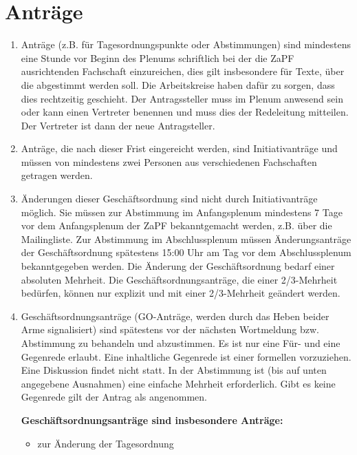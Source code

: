 \documentclass[draft,12pt,oneside]{scrreprt}
\begin{document}
\section{Anträge}

\begin{enumerate}
  \item Anträge (z.B. für Tagesordnungspunkte oder Abstimmungen) sind mindestens
        eine Stunde vor Beginn des Plenums schriftlich bei der die ZaPF
        ausrichtenden Fachschaft einzureichen, dies gilt insbesondere für Texte,
        über die abgestimmt werden soll.
        Die Arbeitskreise haben dafür zu sorgen, dass dies rechtzeitig geschieht.
        Der Antragssteller muss im Plenum anwesend sein oder kann einen Vertreter
        benennen und muss dies der Redeleitung mitteilen.
        Der Vertreter ist dann der neue Antragsteller.

  \item Anträge, die nach dieser Frist eingereicht werden, sind Initiativanträge
        und müssen von mindestens zwei Personen aus verschiedenen Fachschaften
        getragen werden.

  \item Änderungen dieser Geschäftsordnung sind nicht durch Initiativanträge möglich.
        Sie müssen zur Abstimmung im Anfangsplenum mindestens 7 Tage vor dem
        Anfangsplenum der ZaPF bekanntgemacht werden, z.B. über die Mailingliste.
        Zur Abstimmung im Abschlussplenum müssen Änderungsanträge der Geschäftsordnung
        spätestens 15:00 Uhr am Tag vor dem Abschlussplenum bekanntgegeben werden.
        Die Änderung der Geschäftsordnung bedarf einer absoluten Mehrheit.
        Die Geschäftsordnungsanträge, die einer 2/3-Mehrheit bedürfen, können nur
        explizit und mit einer 2/3-Mehrheit geändert werden.

  \item Geschäftsordnungsanträge (GO-Anträge, werden durch das Heben beider Arme
        signalisiert) sind spätestens vor der nächsten Wortmeldung bzw. Abstimmung
        zu behandeln und abzustimmen.
        Es ist nur eine Für- und eine Gegenrede erlaubt.
        Eine inhaltliche Gegenrede ist einer formellen vorzuziehen.
        Eine Diskussion findet nicht statt.
        In der Abstimmung ist (bis auf unten angegebene Ausnahmen) eine einfache
        Mehrheit erforderlich.
        Gibt es keine Gegenrede gilt der Antrag als angenommen.

    \textbf{Geschäftsordnungsanträge sind insbesondere Anträge:}
    \begin{itemize}
      \item zur Änderung der Tagesordnung


\end{itemize}
\end{enumerate}
\end{document}
